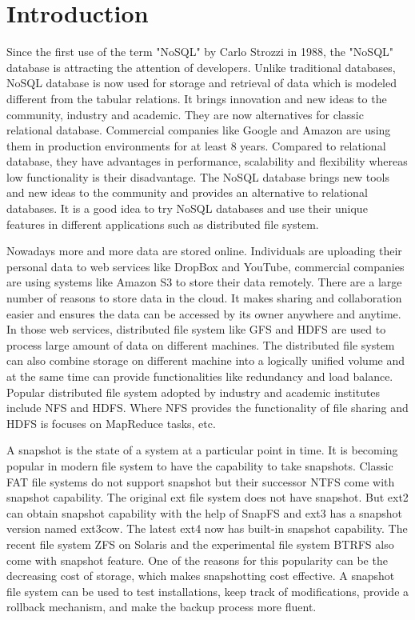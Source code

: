 \chapter{Introduction}
\label{chap:intro}

    Since the first use of the term "NoSQL" by Carlo Strozzi in 1988, the "NoSQL" database is attracting the attention of developers. Unlike traditional databases, NoSQL database is now used for storage and retrieval of data which is modeled different from the tabular relations. It brings innovation and new ideas to the community, industry and academic. They are now alternatives for classic relational database. Commercial companies like Google and Amazon are using them in production environments for at least 8 years. Compared to relational database, they have advantages in performance, scalability and flexibility whereas low functionality is their disadvantage. The NoSQL database brings new tools and new ideas to the community and provides an alternative to relational databases. It is a good idea to try NoSQL databases and use their unique features in different applications such as distributed file system.

    Nowadays more and more data are stored online. Individuals are uploading their personal data to web services like DropBox and YouTube, commercial companies are using systems like Amazon S3 to store their data remotely. There are a large number of reasons to store data in the cloud. It makes sharing and collaboration easier and ensures the data can be accessed by its owner anywhere and anytime. In those web services, distributed file system like GFS and HDFS are used to process large amount of data on different machines. The distributed file system can also combine storage on different machine into a logically unified volume and at the same time can provide functionalities like redundancy and load balance. Popular distributed file system adopted by industry and academic institutes include NFS and HDFS. Where NFS provides the functionality of file sharing and HDFS is focuses on MapReduce tasks, etc.

    A snapshot is the state of a system at a particular point in time. It is becoming popular in modern file system to have the capability to take snapshots. Classic FAT file systems do not support snapshot but their successor NTFS come with snapshot capability. The original ext file system does not have snapshot. But ext2 can obtain snapshot capability with the help of SnapFS and ext3 has a snapshot version named ext3cow. The latest ext4 now has built-in snapshot capability. The recent file system ZFS on Solaris and the experimental file system BTRFS also come with snapshot feature. One of the reasons for this popularity can be the decreasing cost of storage, which makes snapshotting cost effective. A snapshot file system can be used to test installations, keep track of modifications, provide a rollback mechanism, and make the backup process more fluent.

